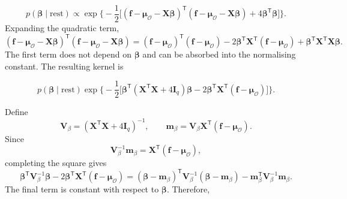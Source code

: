 \documentclass[pdftex,12pt,openright,a4paper,oneside]{book}
\begin{document}
\begin{equation*}
p(\boldsymbol{\beta}\mid\mathrm{rest})
\propto
\exp\Bigg\{-\frac12\Big[
(\mathbf{f}-\boldsymbol{\mu}_{\mathcal{O}}
-\mathbf{X}\boldsymbol{\beta})^{\mathsf T}
(\mathbf{f}-\boldsymbol{\mu}_{\mathcal{O}}
-\mathbf{X}\boldsymbol{\beta})
+4\boldsymbol{\beta}^{\mathsf T}
\boldsymbol{\beta}
\Big]\Bigg\}.
\end{equation*}
Expanding the quadratic term,
\begin{equation*}
(\mathbf{f}-\boldsymbol{\mu}_{\mathcal{O}}
-\mathbf{X}\boldsymbol{\beta})^{\mathsf T}
(\mathbf{f}-\boldsymbol{\mu}_{\mathcal{O}}
-\mathbf{X}\boldsymbol{\beta})=
(\mathbf{f}-\boldsymbol{\mu}_{\mathcal{O}})^{\mathsf T}
(\mathbf{f}-\boldsymbol{\mu}_{\mathcal{O}})
-2\boldsymbol{\beta}^{\mathsf T}
\mathbf{X}^{\mathsf T}
(\mathbf{f}-\boldsymbol{\mu}_{\mathcal{O}})
+\boldsymbol{\beta}^{\mathsf T}
\mathbf{X}^{\mathsf T}
\mathbf{X}\boldsymbol{\beta}.
\end{equation*}
The first term does not depend on
$\boldsymbol{\beta}$ and can be absorbed
into the normalising constant.
The resulting kernel is

\begin{equation*}
p(\boldsymbol{\beta}\mid\mathrm{rest})
\exp\Bigg\{-\frac12\Big[
\boldsymbol{\beta}^{\mathsf T}
(\mathbf{X}^{\mathsf T}\mathbf{X}
+4\mathbf{I}_q)\boldsymbol{\beta}
-2\boldsymbol{\beta}^{\mathsf T}
\mathbf{X}^{\mathsf T}
(\mathbf{f}-\boldsymbol{\mu}_{\mathcal{O}})
\Big]\Bigg\}.
\end{equation*}

Define
\begin{equation*}
\mathbf{V}_{\beta}
=
(\mathbf{X}^{\mathsf T}\mathbf{X}
+4\mathbf{I}_q)^{-1},
\qquad
\mathbf{m}_{\beta}
=
\mathbf{V}_{\beta}
\mathbf{X}^{\mathsf T}
(\mathbf{f}-\boldsymbol{\mu}_{\mathcal{O}}).
\end{equation*}
Since
\begin{equation*}
\mathbf{V}_{\beta}^{-1}\mathbf{m}_{\beta}
=
\mathbf{X}^{\mathsf T}
(\mathbf{f}-\boldsymbol{\mu}_{\mathcal{O}}),
\end{equation*}
completing the square gives
\begin{equation*}
\boldsymbol{\beta}^{\mathsf T}
\mathbf{V}_{\beta}^{-1}\boldsymbol{\beta}
-
2\boldsymbol{\beta}^{\mathsf T}
\mathbf{X}^{\mathsf T}
(\mathbf{f}-\boldsymbol{\mu}_{\mathcal{O}})
=
(\boldsymbol{\beta}-\mathbf{m}_{\beta})^{\mathsf T}
\mathbf{V}_{\beta}^{-1}
(\boldsymbol{\beta}-\mathbf{m}_{\beta})-
\mathbf{m}_{\beta}^{\mathsf T}
\mathbf{V}_{\beta}^{-1}\mathbf{m}_{\beta}.
\end{equation*}
The final term is constant with respect to
$\boldsymbol{\beta}$. Therefore,
\end{document}
